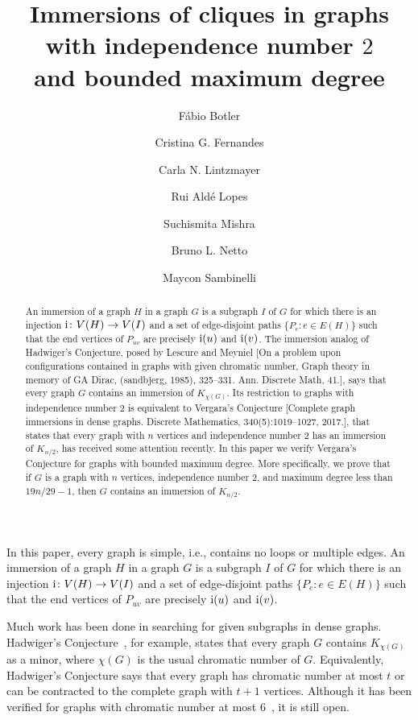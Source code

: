 \documentclass[a4paper,12pt]{article}
\title{Immersions of cliques in graphs \\ with independence number \(2\) \\ and bounded maximum degree}
\author{Fábio Botler \and Cristina G. Fernandes \and Carla N. Lintzmayer \and Rui Aldé Lopes \and Suchismita Mishra  \and Bruno L. Netto  \and Maycon Sambinelli}
\newcommand{\ifun}{{\rm i}}
\begin{document}
\maketitle

\begin{abstract}
An immersion of a graph \(H\) in a graph \(G\)
is a subgraph \(I\) of \(G\) for which there is an injection \(\ifun \colon V(H) \to V(I)\)
and a set of edge-disjoint paths \(\{P_e : e \in E(H)\}\) 
such that the end vertices of \(P_{uv}\) are precisely \(\ifun(u)\) and \(\ifun(v)\).
The immersion analog of Hadwiger's Conjecture, posed by Lescure and Meyniel 
[On a problem upon configurations contained in graphs
with given chromatic number, Graph theory in memory of GA Dirac, (sandbjerg, 1985),
325–331. Ann. Discrete Math, 41.],
says that every graph \(G\) contains an immersion of \(K_{\chi(G)}\).
Its restriction to graphs with independence number \(2\)
is equivalent to Vergara's Conjecture [Complete graph immersions in dense graphs. Discrete Mathematics,
340(5):1019–1027, 2017.],
that states that every graph with \(n\) vertices and independence number 2
has an immersion of \(K_{n/2}\),
has received some attention recently.
In this paper we verify Vergara's Conjecture for graphs with bounded maximum degree.
More specifically, we prove that if \(G\) is a graph with \(n\) vertices,
independence number \(2\), and maximum degree less than \(19n/29 - 1\),
then \(G\) contains an immersion of \(K_{n/2}\).
\end{abstract}




In this paper, every graph is simple, i.e., contains no loops or multiple edges.
An immersion of a graph \(H\) in a graph \(G\)
is a subgraph \(I\) of \(G\) for which there is an injection \(\ifun \colon V(H) \to V(I)\)
and a set of edge-disjoint paths \(\{P_e : e \in E(H)\}\) 
such that the end vertices of \(P_{uv}\) are precisely \(\ifun(u)\) and \(\ifun(v)\).

Much work has been done in searching for given subgraphs in dense graphs.
Hadwiger's Conjecture~\cite{hadwiger1943klassifikation}, for example,
states that every graph \(G\) contains \(K_{\chi(G)}\) as a minor,
where \(\chi(G)\) is the usual chromatic number of \(G\).
Equivalently, Hadwiger's Conjecture says that every graph has chromatic number at most \(t\)
or can be contracted to the complete graph with \(t+1\) vertices.
Although it has been verified for graphs with chromatic number at most \(6\)~\cite{robertson1993hadwiger}, it is still open.
\end{document}
